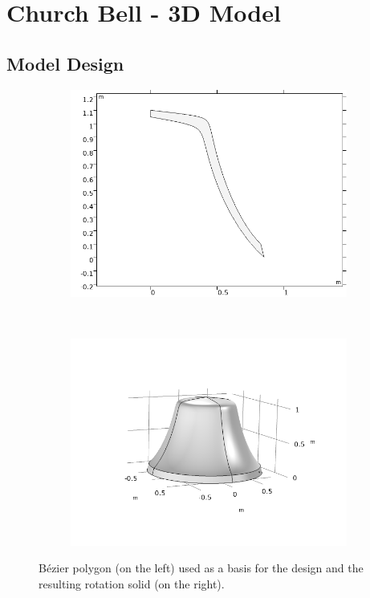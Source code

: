 \documentclass[a4paper]{article}
\begin{document}
\section{Church Bell - 3D Model}
\subsection{Model Design}

\begin{figure}[h]
	\centering
	\begin{subfigure}{0.47\linewidth}
		\includegraphics[width=0.9\linewidth]{bell2D.png}
	\end{subfigure}
	~
	\begin{subfigure}{0.47\linewidth}
		\includegraphics[width=0.9\linewidth]{bell3D.png}
	\end{subfigure}
	\caption{Bézier polygon (on the left) used as a basis for the design and the resulting rotation solid (on the right). }
	\label{fig:shape}
\end{figure}
\end{document}
